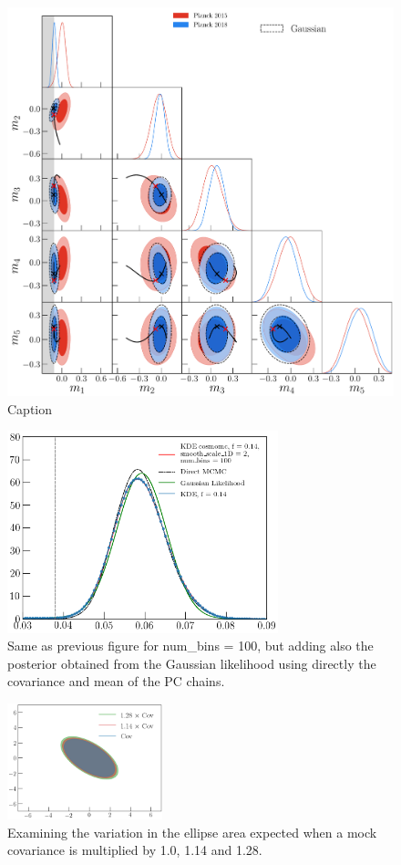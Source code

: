 \documentclass[prd,amsmath,amssymb,floatfix,superscriptaddress,nofootinbib]{revtex4-1}
\begin{document}
\begin{figure}
    \centering
    \includegraphics[width=1.0\textwidth]{paper/plots/plot_mj_triangle_t18_r12_t19_t20_vs_pl18_pc_zmax30_pliklite_srollv2_1015_wTauTrajectory_pl15_wTanhML_wGaussEllipse.pdf}
    \caption{Caption}
    \label{fig:plot_triangle_wGauss}
\end{figure}




\begin{figure}
\includegraphics[width=0.7\textwidth]{ cosmomc_kde/pl18_relike_tanh_tau_dz0p5_oversampled_1D_smooth_scale_1D_2_num_bins_1D_100_post_bug_fix_wGauss.png}
\caption{Same as previous figure for num\_bins = 100, but adding also the posterior obtained from the Gaussian likelihood using directly the covariance and mean of the PC chains.
}
\label{fig:}
\end{figure}



\begin{figure}
\includegraphics[width=0.4\textwidth]{cosmomc_kde/plot_ellipse.png}
\caption{Examining the variation in the ellipse area expected when a mock covariance is multiplied by 1.0, 1.14 and 1.28.
}
\label{fig:}
\end{figure}
\end{document}
